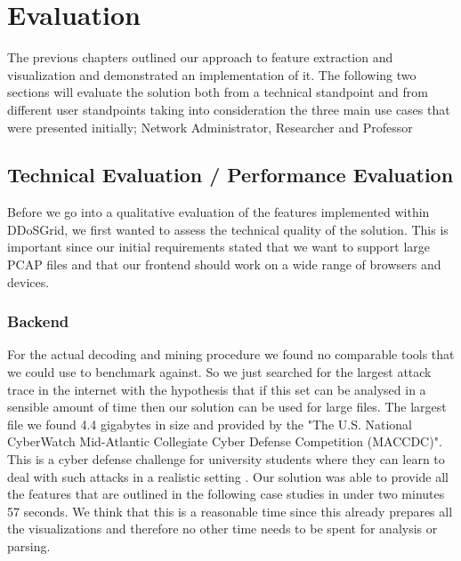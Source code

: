 




\chapter{Evaluation}

The previous chapters outlined our approach to feature extraction and visualization and demonstrated an implementation of it. The following two sections will evaluate the solution both from a technical standpoint and from different user standpoints taking into consideration the three main use cases that were presented initially; Network Administrator, Researcher and Professor
\section{Technical Evaluation / Performance Evaluation}
Before we go into a qualitative evaluation of the features implemented within DDoSGrid, we first wanted to assess the technical quality of the solution. This is important since our initial requirements stated that we want to support large PCAP files and that our frontend should work on a wide range of browsers and devices.
\subsection{Backend}
For the actual decoding and mining procedure we found no comparable tools that we could use to benchmark against. So we just searched for the largest attack trace in the internet with the hypothesis that if this set can be analysed in a sensible amount of time then our solution can be used for large files. The largest file we found 4.4 gigabytes in size and provided by the "The U.S. National CyberWatch Mid-Atlantic Collegiate Cyber Defense Competition (MACCDC)". This is a cyber defense challenge for university students where they can learn to deal with such attacks in a realistic setting \cite{maccdc}.
Our solution was able to provide all the features that are outlined in the following case studies in under two minutes 57 seconds. We think that this is a reasonable time since this already prepares all the visualizations and therefore no other time needs to be spent for analysis or parsing.
